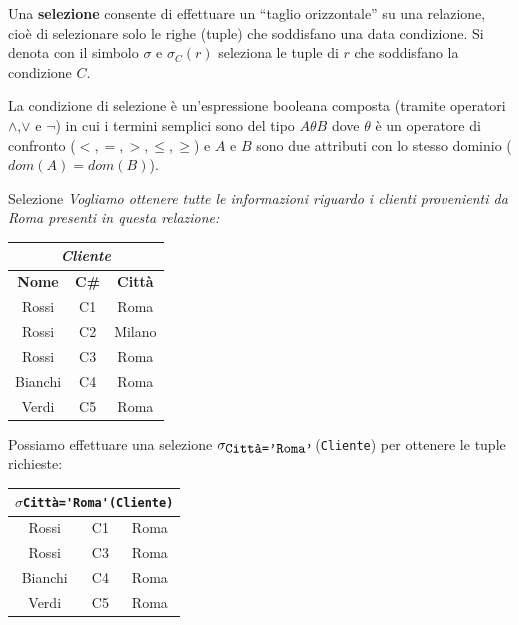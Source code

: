\begin{redbar}
    Una \textbf{selezione} consente di effettuare un “taglio orizzontale” su una relazione, cioè di selezionare solo le righe (tuple) che soddisfano una data condizione. Si denota con il simbolo $\sigma$ e $\sigma_C(r)$ seleziona le tuple di $r$ che soddisfano la condizione $C$.
\end{redbar}

La condizione di selezione è un'espressione booleana composta (tramite operatori $\land$,$\lor$ e $\lnot$) in cui i termini semplici sono del tipo $A\theta B$ dove $\theta$ è un operatore di confronto ($<,=,>,\leq,\geq$) e $A$ e $B$ sono due attributi con lo stesso dominio ($dom(A)=dom(B)$).

\begin{Example}{Selezione}{}
    \textit{Vogliamo ottenere tutte le informazioni riguardo i clienti provenienti da Roma presenti in questa relazione:}
    \begin{center}
        \begin{tabular}{|c|c|c|}
            \hline\multicolumn{3}{|c|}{\textit{Cliente}}\\\hline
            \textbf{Nome} &\textbf{ C\#} & \textbf{Città}\\\hline
            Rossi & C1 & Roma\\
            Rossi & C2 & Milano\\
            Rossi & C3 & Roma\\
            Bianchi & C4 & Roma\\
            Verdi & C5 & Roma\\\hline 
        \end{tabular}
        \bigskip
    \end{center}
    Possiamo effettuare una selezione $\sigma_{\verb|Città='Roma'|}$(\verb|Cliente|) per ottenere le tuple richieste:
    \begin{center}
        \begin{tabular}{|c|c|c|}
            \hline\multicolumn{3}{|c|}{$\sigma$\scriptsize{\Verb|Città='Roma'|}\normalsize\Verb|(Cliente)|}\\\hline
            Rossi & C1 & Roma\\
            Rossi & C3 & Roma\\
            Bianchi & C4 & Roma\\
            Verdi & C5 & Roma\\\hline 

\end{tabular}
\end{center}
\end{Example}
